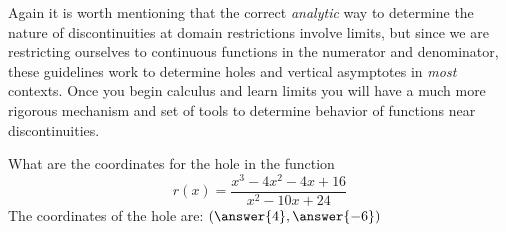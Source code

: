 \documentclass{ximera}
\begin{document}
Again it is worth mentioning that the correct \textit{analytic} way to determine the nature of discontinuities at domain restrictions involve limits, but since we are restricting ourselves to continuous functions in the numerator and denominator, these guidelines work to determine holes and vertical asymptotes in \textit{most} contexts. Once you begin calculus and learn limits you will have a much more rigorous mechanism and set of tools to determine behavior of functions near discontinuities.

\begin{problem}
    What are the coordinates for the hole in the function
    \[
        r(x) = \frac{x^3 - 4x^2 - 4x + 16}{x^2 - 10x + 24}
    \]
    The coordinates of the hole are: $\left(\answer{4},\answer{-6}\right)$
\end{problem}
\end{document}
